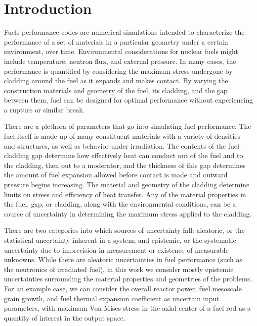 
\chapter{Introduction} %

\label{ch:intro} %




Fuels performance codes are numerical simulations intended to characterize the performance of a set of
materials in a particular geometry under a certain environment, over time.  Environmental considerations
for nuclear fuels might include temperature, neutron flux, and external pressure.  In many cases, the
performance is quantified by considering the maximum stress undergone by cladding around the fuel as it
expands and makes contact.  By varying the construction materials and geometry of the fuel, its cladding, and
the gap between them, fuel can be designed for optimal performance without experiencing a rupture or similar
break.

There are a plethora of parameters that go into simulating fuel performance.  The fuel itself is made up of
many constituent materials with a variety of densities and structures, as well as behavior under irradiation.
The contents of the fuel-cladding gap determine how effectively heat can conduct out of the fuel and to the
cladding, then out to a moderator, and the thickness of this gap determines the amount of fuel expansion
allowed before contact is made and outward pressure begins increasing.  The material and geometry of the
cladding determine limits on stress and efficiency of heat transfer.  Any of the material properties in the
fuel, gap, or cladding, along with the environmental conditions, can be a source of uncertainty in determining
the maximum stress applied to the cladding.

There are two categories into which sources of uncertainty fall: aleatoric, or the statistical uncertainty inherent in a
system; and epistemic, or the systematic uncertainty due to imprecision in measurement or existence of
measurable unknowns.  While there are aleatoric uncertainties in fuel performance (such as the neutronics of
irradiated fuel), in this work we consider mostly epistemic uncertainties surrounding the material properties
and geometries of the problems.  For an example case, we can consider the overall reactor power, fuel mesoscale
grain growth, and fuel thermal expansion coefficient as uncertain input parameters, with maximum Von Mises stress in the 
axial center of a fuel rod as a quantity of interest in the output space.

